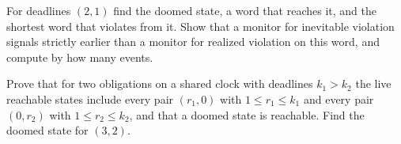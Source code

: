 \begin{exercise}
For deadlines $(2,1)$ find the doomed state, a word that reaches it, and the shortest word that violates from it. Show that a monitor for inevitable violation signals strictly earlier than a monitor for realized violation on this word, and compute by how many events.\label{ex:doomed-21}
\end{exercise}

\begin{exercise}
Prove that for two obligations on a shared clock with deadlines $k_1>k_2$ the live reachable states include every pair $(r_1,0)$ with $1\le r_1\le k_1$ and every pair $(0,r_2)$ with $1\le r_2\le k_2$, and that a doomed state is reachable. Find the doomed state for $(3,2)$.\label{ex:doomed-32}
\end{exercise}

